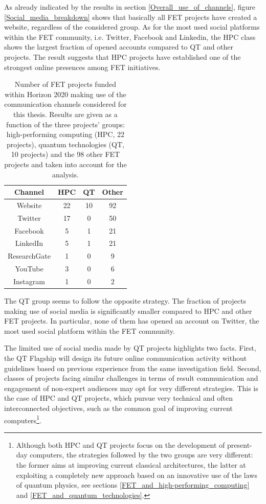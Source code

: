 As already indicated by the results in section \ref{Overall_use_of_channels}, figure \ref{Social_media_breakdown} shows that basically all FET projects have created a website, regardless of the considered group. As for the most used social platforms within the FET community, i.e. Twitter, Facebook and Linkedin, the HPC class shows the largest fraction of opened accounts compared to QT and other projects. The result suggests that HPC projects have established one of the strongest online presences among FET initiatives.  

\begin{table}[t]
 \begin{center}
 {\footnotesize
  \begin{tabular}{cccc}
   \hline 
   \hline
   Channel & HPC & QT & Other \\ 
   \hline
   \hline
   Website & 22 & 10 & 92 \\
   Twitter & 17 & 0 & 50 \\
   Facebook & 5 & 1 & 21 \\
   LinkedIn & 5 & 1 & 21 \\
   ResearchGate & 1 & 0 & 9 \\
   YouTube & 3 & 0 & 6 \\
   Instagram & 1 & 0 & 2 \\
   \hline
   \hline
  \end{tabular}
 }
 \end{center} 
 \caption{Number of FET projects funded within Horizon 2020 making use of the communication channels considered for this thesis. Results are given as a function of the three projects' groups: high-performing computing (HPC, 22 projects), quantum technologies (QT, 10 projects) and the 98 other FET projects and taken into account for the analysis.}
\label{Social_media_breakdown_table} 
\end{table}

The QT group seems to follow the opposite strategy. The fraction of projects making use of social media is significantly smaller compared to HPC and other FET projects. In particular, none of them has opened an account on Twitter, the most used social platform within the FET community. 

The limited use of social media made by QT projects highlights two facts. First, the QT Flagship will design its future online communication activity without guidelines based on previous experience from the same investigation field. Second, classes of projects facing similar challenges in terms of result communication and engagement of non-expert audiences may opt for very different strategies. This is the case of HPC and QT projects, which pursue very technical and often interconnected objectives, such as the common goal of improving current computers\footnote{Although both HPC and QT projects focus on the development of present-day computers, the strategies followed by the two groups are very different: the former aims at improving current classical architectures, the latter at exploiting a completely new approach based on an innovative use of the laws of quantum physics, see sections \ref{FET_and_high-performing_computing} and \ref{FET_and_quantum_technologies}.}.

